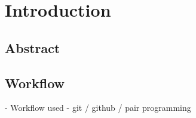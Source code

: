 \chapter{Introduction}

\section{Abstract}
\section{Workflow}
- Workflow used - git / github / pair programming
